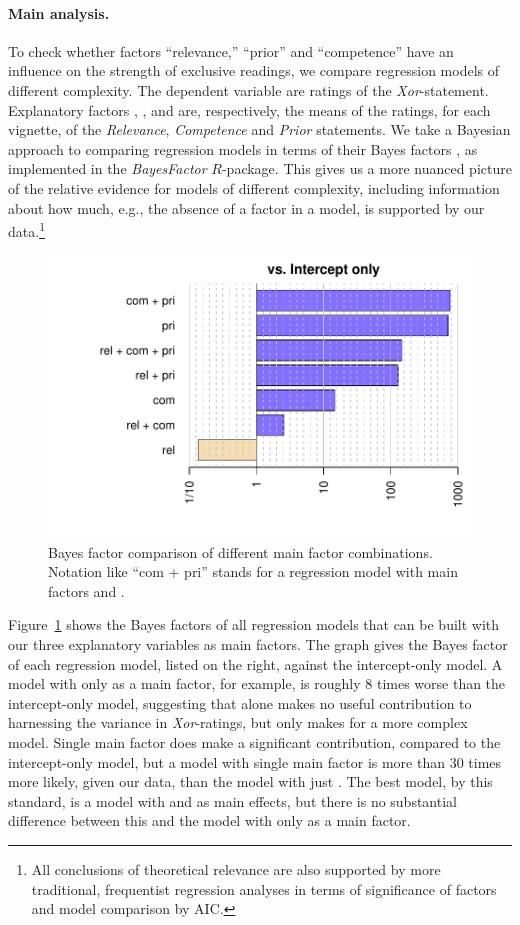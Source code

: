 \documentclass[12pt]{article}
\begin{document}
\paragraph{Main analysis.} To check whether factors ``relevance,'' ``prior'' and ``competence''
have an influence on the strength of exclusive readings, we compare regression models of
different complexity. The dependent variable are ratings of the
\emph{Xor}-statement. Explanatory factors \rel, \com, and \pri are, respectively, the means of
the ratings, for each vignette, of the \emph{Relevance}, \emph{Competence} and \emph{Prior}
statements. We take a Bayesian approach to comparing regression models in terms of their Bayes
factors \citep{RouderMorey2012:Default-Bayes-F}, as implemented in the \emph{BayesFactor}
$R$-package. This gives us a more nuanced picture of the relative evidence for models of
different complexity, including information about how much, e.g., the absence of a factor in a
model, is supported by our data.\footnote{All conclusions of theoretical relevance are also
  supported by more traditional, frequentist regression analyses in terms of significance of
  factors and model comparison by AIC.}

\begin{figure}
  \centering
  \includegraphics[width = 0.8 \textwidth]{pics/bfsAllExp1.pdf}
  \caption{Bayes factor comparison of different main factor combinations. Notation like ``com +
    pri'' stands for a regression model with main factors \com and \pri.}
  \label{fig:BFs}
\end{figure}


Figure~\ref{fig:BFs} shows the Bayes factors of all regression models that can be built with
our three explanatory variables as main factors. The graph gives the Bayes factor of each
regression model, listed on the right, against the intercept-only model. A model with only \rel
as a main factor, for example, is roughly 8 times worse than the intercept-only model,
suggesting that \rel alone makes no useful contribution to harnessing the variance in
\emph{Xor}-ratings, but only makes for a more complex model. Single main factor \com does make
a significant contribution, compared to the intercept-only model, but a model with single main
factor \pri is more than 30 times more likely, given our data, than the model with just
\com. The best model, by this standard, is a model with \com and \pri as main effects, but
there is no substantial difference between this and the model with only \pri as a main factor.
\end{document}
